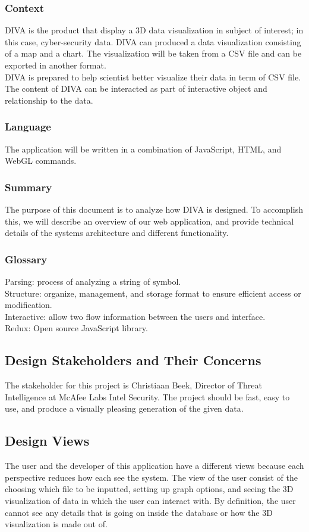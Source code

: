 \documentclass[journal,10pt,onecolumn,compsoc]{IEEEtran} \usepackage[margin=1.0in]{geometry} \usepackage{pdfpages}
\begin{document}
        \subsubsection{Context}
        DIVA is the product that display a 3D data visualization in subject of interest; in this case, cyber-security data. DIVA can produced a data visualization  consisting of a map and a chart. The visualization will be taken from a CSV file and can be exported in another format.\\
        DIVA is prepared to help scientist better visualize their data in term of CSV file. The content of DIVA can be interacted as part of interactive object and relationship to the data. 
        \subsubsection{Language}
        The application will be written in a combination of JavaScript, HTML, and WebGL commands.
        \subsubsection{Summary}
        The purpose of this document is to analyze how DIVA is designed. To accomplish this, we will describe an overview of our web application, and provide technical details of the systems architecture and different functionality.  
        \subsubsection{Glossary}
        Parsing: process of analyzing a string of symbol.\\
        Structure: organize, management, and storage format to ensure efficient access or modification.\\
        Interactive: allow two flow information between the users and interface.\\
        Redux: Open source JavaScript library.
    \subsection{Design Stakeholders and Their Concerns}
    The stakeholder for this project is Christiaan Beek, Director of Threat Intelligence at McAfee Labs Intel Security. The project should be fast, easy to use, and produce a visually pleasing generation of the given data.
    \subsection{Design Views}
    The user and the developer of this application have a different views because each perspective reduces how each see the system. The view of the user consist of the choosing which file to be inputted, setting up graph options, and seeing the 3D visualization of data in which the user can interact with. By definition, the user cannot see any details that is going on inside the database or how the 3D visualization is made out of.
    
\end{document}
